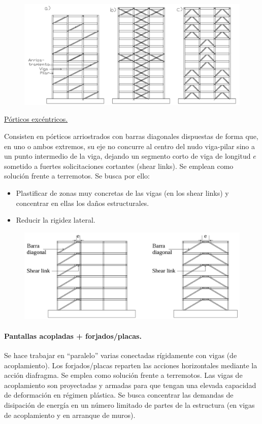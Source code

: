 \begin{figure}[H]
    \centering
    \includegraphics[width=1\linewidth]{Imagenes/Porticos con triangulaciones en distintos vanos.png}
\end{figure}

\noindent \underline{Pórticos excéntricos.}

Consisten en pórticos arriostrados con barras diagonales dispuestas de forma que, en uno o ambos extremos, su eje no concurre al centro del nudo viga-pilar sino a un punto intermedio de la viga, dejando un segmento corto de viga de longitud $e$ sometido a fuertes solicitaciones cortantes (shear links). Se emplean como solución frente a terremotos. Se busca por ello:
\begin{itemize}
    \item Plastificar de zonas muy  concretas de las vigas (en los shear links) y concentrar en ellas los daños estructurales.
    \item Reducir la rigidez lateral.
\end{itemize}

\begin{figure}[H]
    \centering
    \includegraphics[width=1\linewidth]{Imagenes/Porticos excentricos.png}
\end{figure}

\paragraph{Pantallas acopladas + forjados/placas.}
Se hace trabajar en ``paralelo'' varias conectadas rígidamente con vigas (de acoplamiento). Los forjados/placas reparten las acciones horizontales mediante la acción diafragma. Se emplea como solución frente a terremotos. Las vigas de acoplamiento son proyectadas y armadas para que tengan una elevada capacidad de deformación en régimen plástica. Se busca concentrar las demandas de disipación de energía en un número limitado de partes de la estructura (en vigas de acoplamiento y en arranque de muros).

